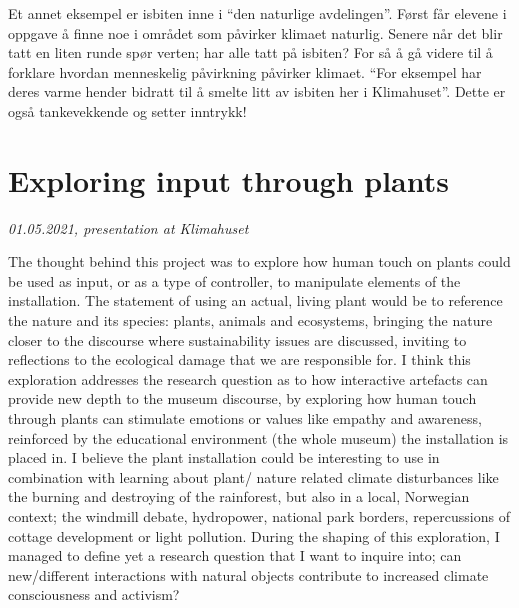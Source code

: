 Et annet eksempel er isbiten inne i “den naturlige avdelingen”.  Først får elevene i oppgave å finne noe i området som påvirker klimaet naturlig. Senere når det blir tatt en liten runde spør verten; har alle tatt på isbiten? For så å gå videre til å forklare hvordan menneskelig påvirkning påvirker klimaet. “For eksempel har deres varme hender bidratt til å smelte litt av isbiten her i Klimahuset”. Dette er også tankevekkende og setter inntrykk!


\section{Exploring input through plants}
\par
\emph{01.05.2021, presentation at Klimahuset}
\par

The thought behind this project was to explore how human touch on plants could be used as input, or as a type of controller, to manipulate elements of the installation. The statement of using an actual, living plant would be to reference the nature and its species: plants, animals and ecosystems, bringing the nature closer to the discourse where sustainability issues are discussed, inviting to reflections to the ecological damage that we are responsible for. I think this exploration addresses the research question as to how interactive artefacts can provide new depth to the museum discourse, by exploring how human touch through plants can stimulate emotions or values like empathy and awareness, reinforced by the educational environment (the whole museum) the installation is placed in. I believe the plant installation could be interesting to use in combination with learning about plant/ nature related climate disturbances like the burning and destroying of the rainforest, but also in a local, Norwegian context; the windmill debate, hydropower, national park borders, repercussions of cottage development or light pollution. During the shaping of this exploration, I managed to define yet a research question that I want to inquire into; can new/different interactions with natural objects contribute to increased climate consciousness and activism?	

